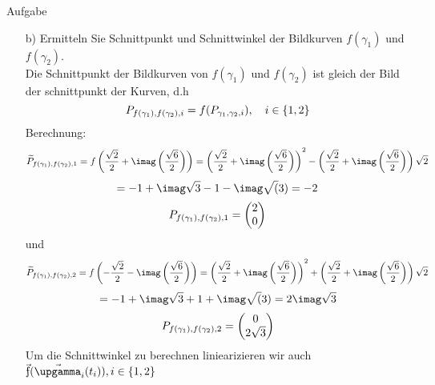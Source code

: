 \documentclass{scrartcl}
\begin{document}
\begin{section}{Aufgabe}
\begin{itemize}
\item[b)]
Ermitteln Sie Schnittpunkt und Schnittwinkel der Bildkurven $f(\gamma_1)$ und $f(\gamma_2)$.\\
Die Schnittpunkt der Bildkurven von $f(\gamma_1)$ und $f(\gamma_2)$ ist gleich der Bild der schnittpunkt der Kurven, d.h
\[P_{f(\gamma_1),f(\gamma_2),i}=f(P_{\gamma_1,\gamma_2,i}),\quad i\in\qty{1,2}\]
Berechnung:
\[\widetilde{P}_{f(\gamma_1),f(\gamma_2),1}=f\left(\frac{\sqrt{2}}{2}+\imag\left(\frac{\sqrt{6}}{2}\right)\right)=\left(\frac{\sqrt{2}}{2}+\imag\left(\frac{\sqrt{6}}{2}\right)\right)^2-\left(\frac{\sqrt{2}}{2}+\imag\left(\frac{\sqrt{6}}{2}\right)\right)\sqrt{2}\]
\[=-1+\imag \sqrt{3}-1 - \imag \sqrt(3)=-2\]
\[P_{f(\gamma_1),f(\gamma_2),1}=\begin{pmatrix}2\\0\end{pmatrix}\]
und
\[\widetilde{P}_{f(\gamma_1),f(\gamma_2),2}
=f\left(-\frac{\sqrt{2}}{2}-\imag\left(\frac{\sqrt{6}}{2}\right)\right)
=\left(\frac{\sqrt{2}}{2}+\imag\left(\frac{\sqrt{6}}{2}\right)\right)^2+\left(\frac{\sqrt{2}}{2}+\imag\left(\frac{\sqrt{6}}{2}\right)\right)\sqrt{2}\]
\[=-1+\imag \sqrt{3}+1 + \imag \sqrt(3)=2 \imag \sqrt 3\]
\[P_{f(\gamma_1),f(\gamma_2),2}=\begin{pmatrix}0\\2\sqrt 3\end{pmatrix}\]
\newcommand{\f}{\vec{\text{\fontshape{ui}\selectfont f}}}
Um die Schnittwinkel zu berechnen liniearizieren wir auch $\f(\vec{\upgamma}_i(t_i)), i \in \qty{1,2}$


\end{itemize}
\end{section}
\end{document}
